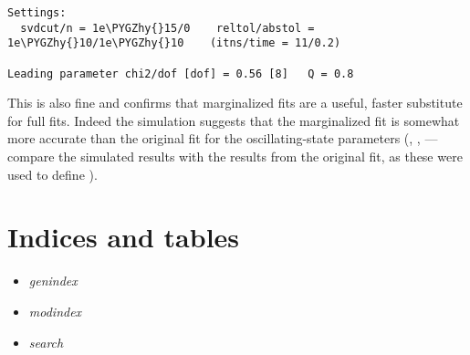 \documentclass[letterpaper,10pt,english]{sphinxmanual}
\def\PYGZhy{\char`\-}
\begin{document}
\begin{itemize}
\begin{Verbatim}[commandchars=\\\{\}]
Settings:
  svdcut/n = 1e\PYGZhy{}15/0    reltol/abstol = 1e\PYGZhy{}10/1e\PYGZhy{}10    (itns/time = 11/0.2)

Leading parameter chi2/dof [dof] = 0.56 [8]   Q = 0.8
\end{Verbatim}

This is also fine and confirms that  marginalized fits
are a useful, faster substitute for full fits. Indeed the simulation
suggests that the marginalized fit is somewhat more accurate
than the original fit for the oscillating-state parameters (,
,  --- compare the simulated results with
the  results from the original fit, as these were used to
define ).

\end{itemize}


\chapter{Indices and tables}
\label{index:indices-and-tables}\begin{itemize}
\item {} 
\emph{genindex}

\item {} 
\emph{modindex}

\item {} 
\emph{search}

\end{itemize}



\renewcommand{\indexname}{Index}
\printindex
\end{document}
